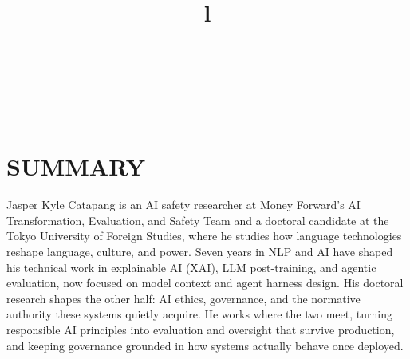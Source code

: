 \documentclass[margin]{res}
\begin{document}
\begin{resume}

\begin{format}
\title{l}\\
\\
\body\\
\end{format}

\section{SUMMARY}
Jasper Kyle Catapang is an AI safety researcher at Money Forward's AI Transformation, Evaluation, and Safety Team and a doctoral candidate at the Tokyo University of Foreign Studies, where he studies how language technologies reshape language, culture, and power. Seven years in NLP and AI have shaped his technical work in explainable AI (XAI), LLM post-training, and agentic evaluation, now focused on model context and agent harness design. His doctoral research shapes the other half: AI ethics, governance, and the normative authority these systems quietly acquire. He works where the two meet, turning responsible AI principles into evaluation and oversight that survive production, and keeping governance grounded in how systems actually behave once deployed.


\end{resume}
\end{document}
